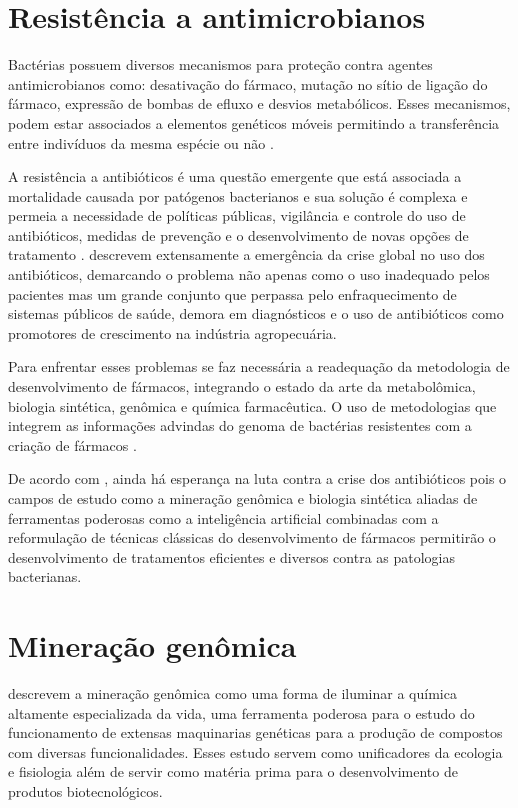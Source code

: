 \section{Resistência a antimicrobianos}
Bactérias possuem diversos mecanismos para proteção contra agentes antimicrobianos como: desativação do fármaco, 
mutação no sítio de ligação do fármaco, expressão de bombas de efluxo e desvios metabólicos. Esses mecanismos, podem
estar associados a elementos genéticos móveis permitindo a transferência entre indivíduos da mesma espécie ou não \cite[p. 150]{Madigan2021}.

A resistência a antibióticos é uma questão emergente que está associada a mortalidade causada por patógenos bacterianos e sua solução
é complexa e permeia a necessidade de políticas públicas, vigilância e controle do uso de antibióticos, medidas de prevenção 
e o desenvolvimento de novas opções de tratamento \cite{frieri2017antibiotic}.   descrevem
extensamente a emergência da crise global no uso dos antibióticos, demarcando o problema não apenas como 
o uso inadequado pelos pacientes mas um grande conjunto que perpassa pelo enfraquecimento de sistemas
públicos de saúde, demora em diagnósticos e o uso de antibióticos como promotores de crescimento
na indústria agropecuária.

Para enfrentar esses problemas se faz necessária a readequação da metodologia de desenvolvimento
de fármacos, integrando o estado da arte da metabolômica, biologia sintética, genômica e química farmacêutica.
O uso de metodologias que integrem as informações advindas do genoma de bactérias resistentes 
com a criação de fármacos \cite{brown2016antibacterial}.

De acordo com , ainda há esperança na luta contra a crise dos antibióticos pois
o campos de estudo como a mineração genômica e biologia sintética aliadas de ferramentas poderosas como
a inteligência artificial combinadas com a reformulação de técnicas clássicas do desenvolvimento de fármacos
permitirão o desenvolvimento de tratamentos eficientes e diversos contra as patologias bacterianas. 

\section{Mineração genômica}
 descrevem a mineração genômica como uma forma de iluminar a química
altamente especializada da vida, uma ferramenta poderosa para o estudo do funcionamento de extensas
maquinarias genéticas para a produção de compostos com diversas funcionalidades. Esses estudo servem
como unificadores da ecologia e fisiologia além de servir como matéria prima para o desenvolvimento
de produtos biotecnológicos.

